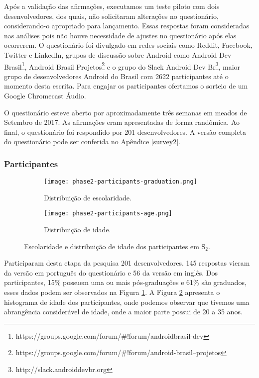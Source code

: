 Após a validação das afirmações, executamos um teste piloto com dois desenvolvedores, dos quais, não solicitaram alterações no questionário, considerando-o apropriado para lançamento. Essas respostas foram consideradas nas análises pois não houve necessidade de ajustes no questionário após elas ocorrerem. O questionário foi divulgado em redes sociais como Reddit, Facebook, Twitter e LinkedIn, grupos de discussão sobre Android como Android Dev Brasil\footnote{https://groups.google.com/forum/\#!forum/androidbrasil-dev}, Android Brasil Projetos\footnote{https://groups.google.com/forum/\#!forum/android-brasil--projetos} e o grupo do Slack Android Dev Br\footnote{http://slack.androiddevbr.org}, maior grupo de desenvolvedores Android do Brasil com 2622 participantes até o momento desta escrita. Para engajar os participantes ofertamos o sorteio de um Google Chromecast Áudio. 

O questionário esteve aberto por aproximadamente três semanas em meados de Setembro de 2017. As afirmações eram apresentadas de forma randômica. Ao final, o questionário foi respondido por 201 desenvolvedores. A versão completa do questionário pode ser conferida no Apêndice \ref{survey2}. 

\subsubsection{Participantes}
\label{etapa-2-participantes}

\begin{figure*}[!b]
\centering
\begin{subfigure}{.62\textwidth}
  \centering
  \texttt{[image: phase2-participants-graduation.png]}
  \caption{Distribuição de escolaridade.}
  \label{fig:phase2-participants-graduation}
\end{subfigure}
\begin{subfigure}{.36\textwidth}
  \centering
  \texttt{[image: phase2-participants-age.png]}
  \caption{Distribuição de idade.}
  \label{fig:phase2-participants-age}
\end{subfigure}%
\caption{Escolaridade e distribuição de idade dos participantes em S$_2$.}
\label{fig:phase2-participants-graduation-age}
\vspace{-.5cm} 
\end{figure*}

Participaram desta etapa da pesquisa 201 desenvolvedores. 145 respostas vieram da versão em português do questionário e 56 da versão em inglês. Dos participantes, 15\% possuem uma ou mais pós-graduações e 61\% são graduados, esses dados podem ser observados na Figura \ref{fig:phase2-participants-graduation}. A Figura \ref{fig:phase2-participants-age} apresenta o histograma de idade dos participantes, onde podemos observar que tivemos uma abrangência considerável de idade, onde a maior parte possui de 20 a 35 anos.  


